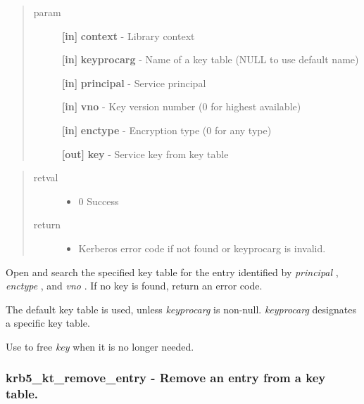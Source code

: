 \documentclass[letterpaper,10pt,english]{sphinxmanual}
\begin{document}
\begin{quote}\begin{description}
\item[{param}] \leavevmode
\textbf{{[}in{]}} \textbf{context} - Library context

\textbf{{[}in{]}} \textbf{keyprocarg} - Name of a key table (NULL to use default name)

\textbf{{[}in{]}} \textbf{principal} - Service principal

\textbf{{[}in{]}} \textbf{vno} - Key version number (0 for highest available)

\textbf{{[}in{]}} \textbf{enctype} - Encryption type (0 for any type)

\textbf{{[}out{]}} \textbf{key} - Service key from key table

\end{description}\end{quote}
\begin{quote}\begin{description}
\item[{retval}] \leavevmode\begin{itemize}
\item {} 
0   Success

\end{itemize}

\item[{return}] \leavevmode\begin{itemize}
\item {} 
Kerberos error code if not found or keyprocarg is invalid.

\end{itemize}

\end{description}\end{quote}

Open and search the specified key table for the entry identified by \emph{principal} , \emph{enctype} , and \emph{vno} . If no key is found, return an error code.

The default key table is used, unless \emph{keyprocarg} is non-null. \emph{keyprocarg} designates a specific key table.

Use {\hyperref[appdev/refs/api/krb5_free_keyblock:c.krb5_free_keyblock]{}} to free \emph{key} when it is no longer needed.


\subsubsection{krb5\_kt\_remove\_entry -  Remove an entry from a key table.}
\label{appdev/refs/api/krb5_kt_remove_entry::doc}\label{appdev/refs/api/krb5_kt_remove_entry:krb5-kt-remove-entry-remove-an-entry-from-a-key-table}
\end{document}
